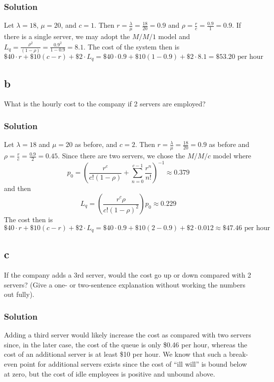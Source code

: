 \documentclass[letterpaper]{amsart}
\begin{document}
\subsubsection*{Solution}
Let $\lambda = 18$, $\mu=20$,
and $c=1$. Then $r=\frac{\lambda}{\mu}=\frac{18}{20}=0.9$ and
$\rho = \frac{r}{c} = \frac{0.9}{1} = 0.9$.
If there is a single server, we may adopt the $M/M/1$ model and
$L_q=\frac{\rho^2}{(1-\rho)}=\frac{0.9^2}{1-0.9}=8.1$.
The cost of the system then is
\begin{equation*}
  \$40\cdot r + \$10(c-r) + \$2\cdot L_q
  =\$40\cdot 0.9 + \$10(1-0.9) + \$2\cdot 8.1
  = \$53.20\text{ per hour}
\end{equation*}
\subsection*{b}
What is the hourly cost to the company if 2 servers are employed?
\subsubsection*{Solution}
Let $\lambda = 18$ and $\mu=20$ as before,
and $c=2$. Then $r=\frac{\lambda}{\mu}=\frac{18}{20}=0.9$ as before and
$\rho = \frac{r}{c} = \frac{0.9}{2} = 0.45$.
Since there are two servers, we chose the $M/M/c$ model where
\begin{equation*}
  p_0=\left( \frac{r^c}{c!(1-\rho)}+\sum_{n=0}^{c-1}\frac{r^n}{n!}\right)^{-1}\approx 0.379
\end{equation*}
and then
\begin{equation*}
  L_q=\left( \frac{r^c\rho}{c!(1-\rho)^2}\right)p_0\approx 0.229
\end{equation*}
The cost then is
\begin{equation*}
  \$40\cdot r + \$10(c-r) + \$2\cdot L_q
  =\$40\cdot 0.9 + \$10(2-0.9) + \$2\cdot 0.012
  \approx \$47.46\text{ per hour}
\end{equation*}

\subsection*{c}
If the company adds a 3rd server, would the cost go up or down compared
with 2 servers? (Give a one- or two-sentence explanation without working
the numbers out fully).
\subsubsection*{Solution}
Adding a third server would likely increase the cost as compared with two
servers since, in the later case, the cost of the queue is only \$0.46 per hour,
whereas the cost of an additional server is at least \$10 per hour.
We know that such a break-even point for additional servers exists since the
cost of ``ill will'' is bound below at zero, but the cost of idle employees is
positive and unbound above.
\end{document}

